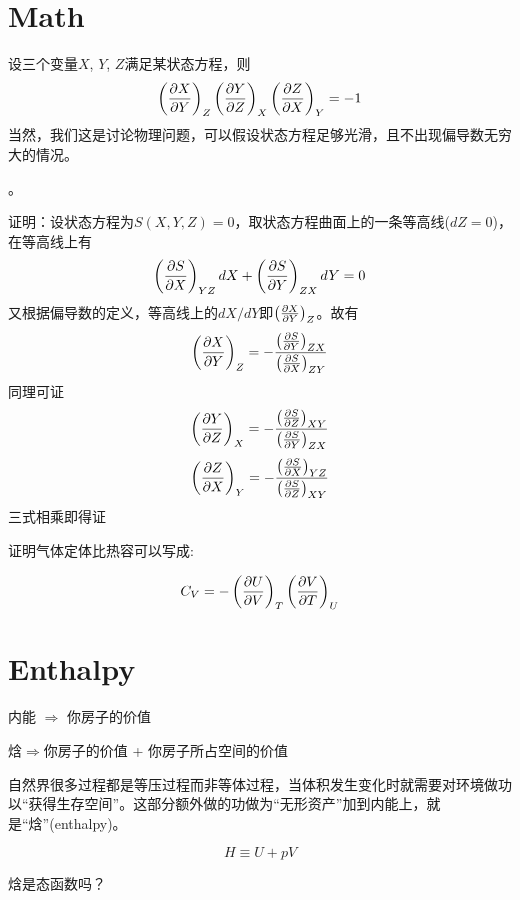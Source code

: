 \documentclass[CJK]{beamer}
\begin{document}
\section{Math}

\begin{frame}
\bch
设三个变量$X$, $Y$, $Z$满足某状态方程，则
{\blue 
$$\pfrac XYZ  \pfrac YZX \pfrac ZXY = -1$$
}
当然，我们这是讨论物理问题，可以假设状态方程足够光滑，且不出现偏导数无穷大的情况。

\skipline

。
\ech
\end{frame}

\begin{frame}
\bch
{\scriptsize
证明：设状态方程为$S(X, Y, Z) = 0$，取状态方程曲面上的一条等高线($dZ = 0$)，在等高线上有
$$\pfrac SX{YZ} dX + \pfrac SY{ZX} dY = 0$$
又根据偏导数的定义，等高线上的$dX/dY$即$\pfrac XYZ$。故有
$$\pfrac XYZ = -\frac{\pfrac SY{ZX}}{\pfrac SX{ZY}}$$
同理可证
$$\pfrac YZX = -\frac{\pfrac SZ{XY}}{\pfrac SY{ZX}}$$
$$\pfrac ZXY = -\frac{\pfrac SX{YZ}}{\pfrac SZ{XY}}$$
三式相乘即得证
}
\ech
\end{frame}

\begin{frame}
\bch
{}

证明气体定体比热容可以写成:

$$
C_V =  - \pfrac UVT \pfrac VTU 
$$

\ech
\end{frame}


\section{Enthalpy}

\begin{frame}
\bch

内能 $\Rightarrow$ 你房子的价值

焓$\Rightarrow$你房子的价值 + 你房子所占空间的价值

\skipline

自然界很多过程都是等压过程而非等体过程，当体积发生变化时就需要对环境做功以“获得生存空间”。这部分额外做的功做为“无形资产”加到内能上，就是“焓”(enthalpy)。

$$ H \equiv U + pV$$


\ech
\end{frame}

\begin{frame}
\bch
{}
焓是态函数吗？
\ech
\end{frame}
\end{document}
